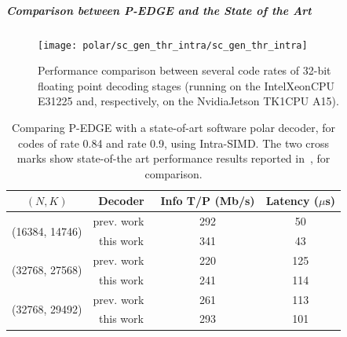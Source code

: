 \subparagraph{Comparison between P-EDGE and the State of the Art}

\begin{figure}[htp]
  \texttt{[image: polar/sc\_gen\_thr\_intra/sc\_gen\_thr\_intra]}
  \caption{Performance comparison between several code rates of 32-bit floating
    point decoding stages (running on the Intel\R Xeon\R CPU E31225 and,
    respectively, on the Nvidia\R Jetson TK1\R CPU A15).}
  \label{plot:polar_sc_gen_thr_intra}
\end{figure}

\begin{table}
  \begin{center}
  \begin{tabular}{c c c c}
    \hline
    $(N, K)$                        & Decoder                      & Info T/P (Mb/s) & Latency ($\mu$s)\\
    \hline
    \multirow{2}{*}{(16384, 14746)} & prev. work~\cite{Sarkis2014} & 292             & 50              \\
                                    & this work                    & 341             & 43              \\
    \hline
    \multirow{2}{*}{(32768, 27568)} & prev. work~\cite{Sarkis2014} & 220             & 125             \\
                                    & this work                    & 241             & 114             \\
    \hline
    \multirow{2}{*}{(32768, 29492)} & prev. work~\cite{Sarkis2014} & 261             & 113             \\
                                    & this work                    & 293             & 101             \\
    \hline
  \end{tabular}
  \end{center}
  \caption{Comparing P-EDGE with a state-of-art software polar decoder, for
    codes of rate 0.84 and rate 0.9, using Intra-SIMD. The two cross marks show
    state-of-the art performance results reported in~\cite{Sarkis2014}, for
    comparison.}
  \label{tab:polar_sc_gen_thr_comparison}
\end{table}


